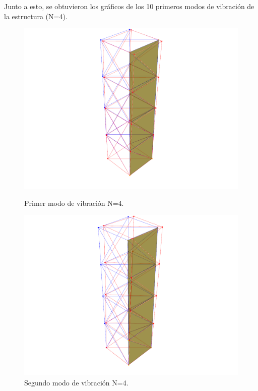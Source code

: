 Junto a esto, se obtuvieron los gráficos de los 10 primeros modos de vibración de la estructura (N=4).

\begin{figure}[H]
    \begin{minipage}[b]{0.5\textwidth}
        \centering
        \includegraphics[width=\textwidth]{FOTOS/mod1_4.png}
        \caption{Primer modo de vibración N=4.}
    \end{minipage}
    \hfill
    \begin{minipage}[b]{0.5\textwidth}
        \centering
        \includegraphics[width=\textwidth]{FOTOS/mod2_4.png}
        \caption{Segundo modo de vibración N=4.}
    \end{minipage}
\end{figure}

